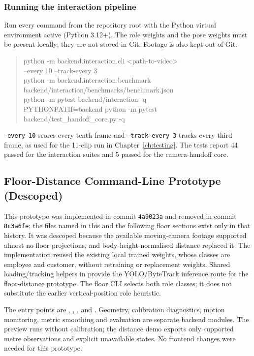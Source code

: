 \subsubsection*{Running the interaction pipeline}
Run every command from the repository root with the Python virtual environment active (Python 3.12+). The role weights  and the pose weights  must be present locally; they are not stored in Git. Footage is also kept out of Git.
\begin{quote}\small\ttfamily
python -m backend.interaction.cli <path-to-video>\\
\hspace*{1em}--every 10 --track-every 3\\
python -m backend.interaction.benchmark\\
\hspace*{1em}backend/interaction/benchmarks/benchmark.json\\
python -m pytest backend/interaction -q\\
PYTHONPATH=backend python -m pytest backend/test\_handoff\_core.py -q
\end{quote}
\texttt{--every 10} scores every tenth frame and \texttt{--track-every 3} tracks every third frame, as used for the 11-clip run in Chapter~\ref{ch:testing}. The tests report 44 passed for the interaction suites and 5 passed for the camera-handoff core.

\subsection{Floor-Distance Command-Line Prototype (Descoped)}
\label{sec:floor-descoped}
This prototype was implemented in commit \texttt{4a9023a} and removed in commit \texttt{8c3a6fe}; the files named in this and the following floor sections exist only in that history. It was descoped because the available moving-camera footage supported almost no floor projections, and body-height-normalised distance replaced it. The implementation reused the existing local trained  weights, whose classes are employee and customer, without retraining or replacement weights. Shared loading/tracking helpers in  provide the YOLO/ByteTrack inference route for the floor-distance prototype. The floor CLI selects both role classes; it does not substitute the earlier vertical-position role heuristic.

The entry points are , , , and . Geometry, calibration diagnostics, motion monitoring, metric smoothing and evaluation are separate backend modules. The preview runs without calibration; the distance demo exports only supported metre observations and explicit unavailable states. No frontend changes were needed for this prototype.

